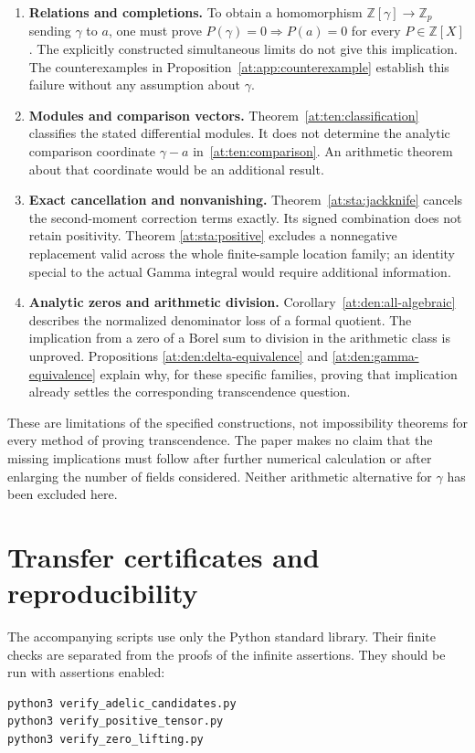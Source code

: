 \documentclass[11pt,a4paper]{article}
\newcommand{\Z}{\mathbb Z}
\theoremstyle{definition}
\theoremstyle{remark}
\numberwithin{equation}{section}
\begin{document}
\begin{enumerate}
\item \textbf{Relations and completions.}
To obtain a homomorphism $\Z[\gamma]\to\Z_p$ sending $\gamma$ to $a$,
one must prove $P(\gamma)=0\Rightarrow P(a)=0$ for every
$P\in\Z[X]$. The explicitly constructed simultaneous limits do not
give this implication. The counterexamples in
Proposition~\ref{at:app:counterexample} establish this failure without
any assumption about $\gamma$.
\item \textbf{Modules and comparison vectors.}
Theorem~\ref{at:ten:classification} classifies the stated differential
modules. It does not determine the analytic comparison coordinate
$\gamma-a$ in~\eqref{at:ten:comparison}. An arithmetic theorem about that
coordinate would be an additional result.
\item \textbf{Exact cancellation and nonvanishing.}
Theorem~\ref{at:sta:jackknife} cancels the second-moment correction terms
exactly. Its signed combination does not retain positivity. Theorem
\ref{at:sta:positive} excludes a nonnegative replacement valid across the
whole finite-sample location family; an identity special to the
actual Gamma integral would require additional information.
\item \textbf{Analytic zeros and arithmetic division.}
Corollary~\ref{at:den:all-algebraic} describes the normalized denominator
loss of a formal quotient. The implication from a zero of a Borel sum
to division in the arithmetic class is unproved. Propositions
\ref{at:den:delta-equivalence} and \ref{at:den:gamma-equivalence} explain
why, for these specific families, proving that implication already
settles the corresponding transcendence question.
\end{enumerate}

These are limitations of the specified constructions, not impossibility
theorems for every method of proving transcendence. The paper makes no
claim that the missing implications must follow after further numerical
calculation or after enlarging the number of fields considered. Neither
arithmetic alternative for $\gamma$ has been excluded here.


\section{Transfer certificates and reproducibility}
\label{at:app:verification}

The accompanying scripts use only the Python standard library. Their
finite checks are separated from the proofs of the infinite assertions.
They should be run with assertions enabled:
\begin{verbatim}
python3 verify_adelic_candidates.py
python3 verify_positive_tensor.py
python3 verify_zero_lifting.py
\end{verbatim}
\end{document}
